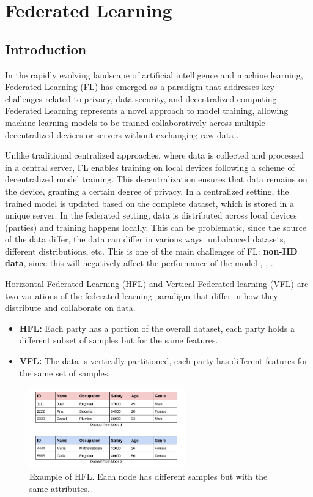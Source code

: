 \chapter{Federated Learning}
\label{ch:Federated_Learning}

\section{Introduction}
In the rapidly evolving landscape of artificial intelligence and machine learning, Federated Learning (FL)
has emerged as a paradigm that addresses key challenges related to privacy, data security,
 and decentralized computing. Federated Learning represents a novel approach to model training, allowing
 machine learning models to be trained collaboratively across multiple decentralized devices or servers
 without exchanging raw data \cite{mcmahan2023a}.

 Unlike traditional centralized approaches, where data is collected and processed in a central server, FL enables training on local devices following a scheme of decentralized model training.
 This decentralization ensures that data remains on the device, granting a certain degree of privacy.
 In a centralized setting, the trained model is updated based on the complete dataset, which is stored in a unique server. In the federated setting, data is distributed across local devices (parties) and training happens locally. This can be problematic, since the source
 of the data differ, the data can differ in various ways: unbalanced datasets, different distributions, etc. This is one of the main challenges of FL:
 \textbf{non-IID data}, since this will negatively affect the performance of the model \cite{li2020}, \cite{zhao2018}, \cite{li2021}.

Horizontal Federated Learning (HFL) and Vertical Federated learning (VFL) are two variations of the federated learning paradigm that differ in how they distribute and collaborate on data.

\begin{itemize}
    \item \textbf{HFL:} Each party has a portion of the overall dataset, each party holds a different subset of samples but for the same features.
    \item \textbf{VFL:} The data  is vertically partitioned, each party has different features for the same set of samples.
\end{itemize}

\begin{figure}[H]
  \centering
  \includegraphics[width=0.6\textwidth]{figures/2-Federated_Learning/HFL.png}
  \caption{Example of HFL. Each node has different samples but with the same attributes.}
  \label{fig:HFL}
\end{figure}

